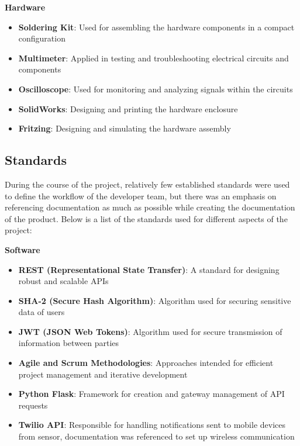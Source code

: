 \documentclass[conference]{IEEEtran}
\begin{document}
\textbf{Hardware}
\begin{itemize}
      \item \textbf{Soldering Kit}: Used for assembling the hardware components in a compact configuration
      \item \textbf{Multimeter}: Applied in testing and troubleshooting electrical circuits and components
      \item \textbf{Oscilloscope}: Used for monitoring and analyzing signals within the circuits
      \item \textbf{SolidWorks}: Designing and printing the hardware enclosure
      \item \textbf{Fritzing}: Designing and simulating the hardware assembly
\end{itemize}


\subsection{Standards}

During the course of the project, relatively few established standards were used to
define the workflow of the developer team, but there was an emphasis on referencing
documentation as much as possible while creating the documentation of the product.
Below is a list of the standards used for different aspects of the project:

\textbf{Software}
\begin{itemize}
      \item \textbf{REST (Representational State Transfer)}: A standard for designing
            robust and scalable APIs
      \item \textbf{SHA-2 (Secure Hash Algorithm)}: Algorithm used for securing
            sensitive data of users
      \item \textbf{JWT (JSON Web Tokens)}: Algorithm used for secure transmission of
            information between parties
      \item \textbf{Agile and Scrum Methodologies}: Approaches intended for efficient
            project management and iterative development
      \item \textbf{Python Flask}: Framework for creation and gateway management of API
            requests
      \item \textbf{Twilio API}: Responsible for handling notifications sent to mobile
            devices from sensor, documentation was referenced to set up wireless communication
\end{itemize}
\end{document}
